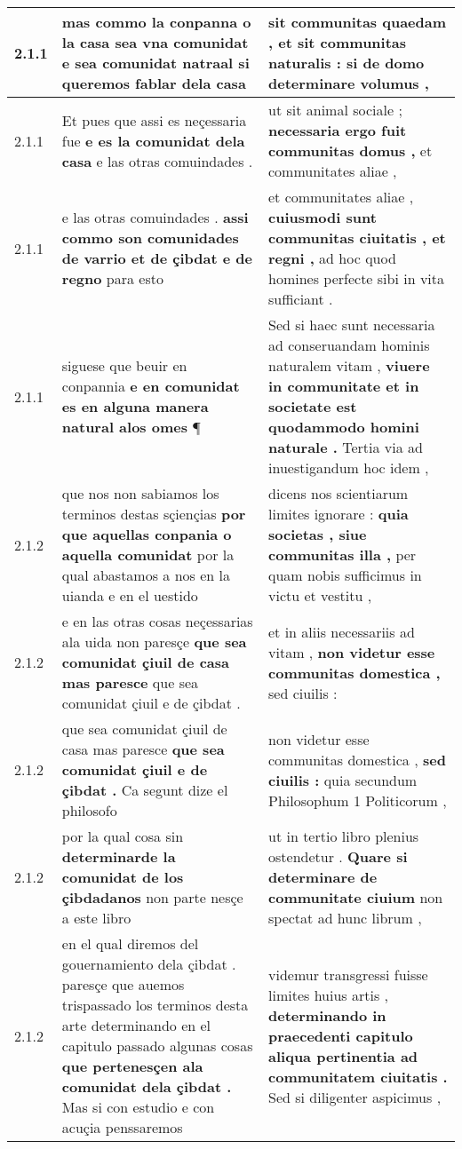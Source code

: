 \begin{tabular}{|p{1cm}|p{6.5cm}|p{6.5cm}|}
2.1.1 & mas commo la conpanna o la casa sea vna comunidat \textbf{ e sea comunidat natraal } si queremos fablar dela casa & sit communitas quaedam , \textbf{ et sit communitas naturalis : } si de domo determinare volumus , \\\hline
2.1.1 & Et pues que assi es neçessaria fue \textbf{ e es la comunidat dela casa } e las otras comuindades . & ut sit animal sociale ; \textbf{ necessaria ergo fuit communitas domus , } et communitates aliae , \\\hline
2.1.1 & e las otras comuindades . \textbf{ assi commo son comunidades de varrio et de çibdat e de regno } para esto & et communitates aliae , \textbf{ cuiusmodi sunt communitas ciuitatis , et regni , } ad hoc quod homines perfecte sibi in vita sufficiant . \\\hline
2.1.1 & siguese que beuir en conpannia \textbf{ e en comunidat es en alguna manera natural alos omes } ¶ & Sed si haec sunt necessaria ad conseruandam hominis naturalem vitam , \textbf{ viuere in communitate et in societate est quodammodo homini naturale . } Tertia via ad inuestigandum hoc idem , \\\hline
2.1.2 & que nos non sabiamos los terminos destas sçiençias \textbf{ por que aquellas conpania o aquella comunidat } por la qual abastamos a nos en la uianda e en el uestido & dicens nos scientiarum limites ignorare : \textbf{ quia societas , siue communitas illa , } per quam nobis sufficimus in victu et vestitu , \\\hline
2.1.2 & e en las otras cosas neçessarias ala uida non paresçe \textbf{ que sea comunidat çiuil de casa mas paresce } que sea comunidat çiuil e de çibdat . & et in aliis necessariis ad vitam , \textbf{ non videtur esse communitas domestica , } sed ciuilis : \\\hline
2.1.2 & que sea comunidat çiuil de casa mas paresce \textbf{ que sea comunidat çiuil e de çibdat . } Ca segunt dize el philosofo & non videtur esse communitas domestica , \textbf{ sed ciuilis : } quia secundum Philosophum 1 Politicorum , \\\hline
2.1.2 & por la qual cosa sin \textbf{ determinarde la comunidat de los çibdadanos } non parte nesçe a este libro & ut in tertio libro plenius ostendetur . \textbf{ Quare si determinare de communitate ciuium } non spectat ad hunc librum , \\\hline
2.1.2 & en el qual diremos del gouernamiento dela çibdat . paresçe que auemos trispassado los terminos desta arte determinando en el capitulo passado algunas cosas \textbf{ que pertenesçen ala comunidat dela çibdat . } Mas si con estudio e con acuçia penssaremos & videmur transgressi fuisse limites huius artis , \textbf{ determinando in praecedenti capitulo aliqua pertinentia ad communitatem ciuitatis . } Sed si diligenter aspicimus , \\\hline

\end{tabular}
